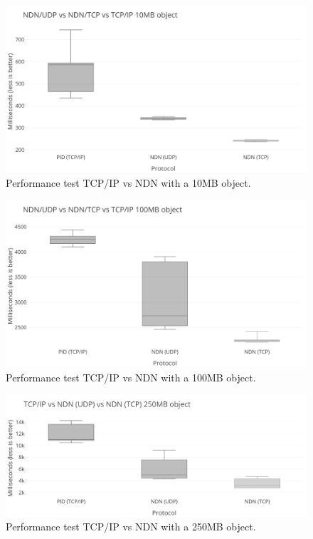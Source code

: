\begin{figure}[H]
\centering
\includegraphics[scale=0.43]{Images/bench10MB_grey.png}
\caption{Performance test TCP/IP vs NDN with a 10MB object.}
\label{fig:perftest-1}
\end{figure}

\begin{figure}[H]
\centering
\includegraphics[scale=0.43]{Images/bench100MB_grey.png}
\caption{Performance test TCP/IP vs NDN with a 100MB object.}
\label{fig:perftest-2}
\end{figure}

\begin{figure}[H]
\centering
\includegraphics[scale=0.43]{Images/ndn_tcpip_250_grey.png}
\caption{Performance test TCP/IP vs NDN with a 250MB object.}
\label{fig:perftest-3}
\end{figure}

